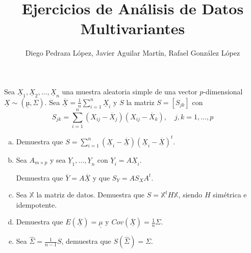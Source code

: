 \documentclass[twoside]{article}
\newcommand{\media}[1]{{\overline{#1}}}
\newcommand{\muestra}[1]{{\underline{#1}}}
\newcommand{\m}[1]{{\muestra{#1}}}
\newcommand{\mX}{{\muestra{X}}}
\begin{document}
\title{Ejercicios de Análisis de Datos Multivariantes}
\author{Diego Pedraza López, Javier Aguilar Martín, Rafael González López}
\maketitle

\begin{ejercicio}{1.1}
Sea $\mX_1, \mX_2, \dots, \mX_n$ una muestra aleatoria simple de una vector $p$-dimensional $\mX \sim (\m{µ},Σ)$.
Sea $\media{\m{X}} = \frac{1}{n}\sum_{i=1}^n \m{X}_i$ y $S$ la matriz $S = [S_{jk}]$ con
\[ S_{jk} = \sum_{i=1}^n (X_{ij} - \media{X}_j)(X_{ij}-\media{X}_k), \quad j,k=1,\dots,p\]
\begin{enumerate}[(a)]
\item Demuestra que $S = \sum_{i=1}^n (\mX_i-\media{\m{X}})(\mX_i-\media{\m{X}})^t$.
\item Sea $A_{m\times p}$ y sea $\m{Y}_1,\dots,\m{Y}_n$ con $\m{Y}_i = A \m{X}_i$.

Demuestra que $\media{Y}=A \media{\mX}$ y que $S_Y = A S_X A^t$.
\item Sea $\mathbb{X}$ la matriz de datos. Demuestra que $S = \mathbb{X}^t H \mathbb{X}$, siendo $H$ simétrica e idempotente.
\item Demuestra que $E(\media{\mX}) = \m{μ}$ y $Cov(\media{\m{X}}) = \frac{1}{n} Σ$.
\item Sea $\hat{Σ} = \frac{1}{n-1}S$, demuestra que $S(\hat{Σ}) = Σ$.
\end{enumerate}
\end{ejercicio}

\newpage
\end{document}
